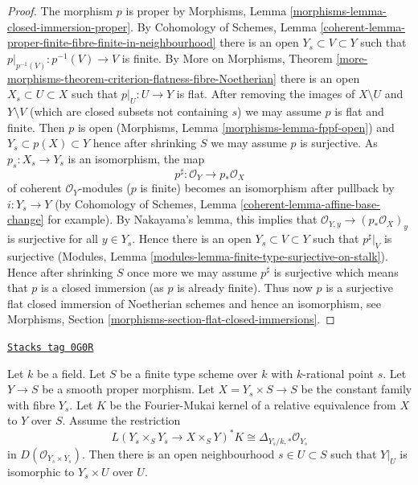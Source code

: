 \begin{proof}
The morphism $p$ is proper by Morphisms, Lemma
\ref{morphisms-lemma-closed-immersion-proper}.
By Cohomology of Schemes, Lemma
\ref{coherent-lemma-proper-finite-fibre-finite-in-neighbourhood}
there is an open $Y_s \subset V \subset Y$ such that
$p|_{p^{-1}(V)} : p^{-1}(V) \to V$ is finite.
By More on Morphisms, Theorem
\ref{more-morphisms-theorem-criterion-flatness-fibre-Noetherian}
there is an open $X_s \subset U \subset X$ such that
$p|_U : U \to Y$ is flat. After removing the images of
$X \setminus U$ and $Y \setminus V$ (which are closed subsets
not containing $s$) we may assume $p$ is flat and finite.
Then $p$ is open (Morphisms, Lemma \ref{morphisms-lemma-fppf-open})
and $Y_s \subset p(X) \subset Y$ hence after shrinking $S$
we may assume $p$ is surjective.
As $p_s : X_s \to Y_s$ is an isomorphism, the map
$$
p^\sharp : \mathcal{O}_Y \longrightarrow p_*\mathcal{O}_X
$$
of coherent $\mathcal{O}_Y$-modules ($p$ is finite)
becomes an isomorphism after pullback by $i : Y_s \to Y$
(by Cohomology of Schemes, Lemma
\ref{coherent-lemma-affine-base-change} for example).
By Nakayama's lemma, this implies that
$\mathcal{O}_{Y, y} \to (p_*\mathcal{O}_X)_y$ is surjective
for all $y \in Y_s$. Hence there is an open $Y_s \subset V \subset Y$
such that $p^\sharp|_V$ is surjective
(Modules, Lemma \ref{modules-lemma-finite-type-surjective-on-stalk}).
Hence after shrinking $S$ once more we may assume
$p^\sharp$ is surjective which means that $p$ is a closed
immersion (as $p$ is already finite).
Thus now $p$ is a surjective flat closed immersion
of Noetherian schemes and hence an isomorphism, see
Morphisms, Section \ref{morphisms-section-flat-closed-immersions}.
\end{proof}

\begin{lemma}[No deformations]
\label{equiv-lemma-no-deformations}
\href{https://stacks.math.columbia.edu/tag/0G0R}{\texttt{Stacks tag 0G0R}}

Let $k$ be a field. Let $S$ be a finite type scheme over $k$
with $k$-rational point $s$. Let $Y \to S$ be a smooth proper morphism.
Let $X = Y_s \times S \to S$ be the constant family with fibre
$Y_s$. Let $K$ be the Fourier-Mukai kernel of a relative equivalence
from $X$ to $Y$ over $S$. Assume the restriction
$$
L(Y_s \times_S Y_s \to X \times_S Y)^*K \cong
\Delta_{Y_s/k, *} \mathcal{O}_{Y_s}
$$
in $D(\mathcal{O}_{Y_s \times Y_s})$. Then there is an open neighbourhood
$s \in U \subset S$ such that $Y|_U$ is isomorphic to $Y_s \times U$ over $U$.
\end{lemma}


